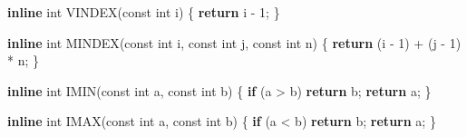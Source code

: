 \documentclass[
  12pt,
  letterpaper,
  DIV=11,
  numbers=noendperiod]{scrreprt}
\newenvironment{Shaded}{\begin{snugshade}}{\end{snugshade}}
\newcommand{\ControlFlowTok}[1]{\textcolor[rgb]{0.00,0.23,0.31}{\textbf{#1}}}
\newcommand{\DataTypeTok}[1]{\textcolor[rgb]{0.68,0.00,0.00}{#1}}
\newcommand{\DecValTok}[1]{\textcolor[rgb]{0.68,0.00,0.00}{#1}}
\newcommand{\KeywordTok}[1]{\textcolor[rgb]{0.00,0.23,0.31}{\textbf{#1}}}
\newcommand{\NormalTok}[1]{\textcolor[rgb]{0.00,0.23,0.31}{#1}}
\newcommand{\OperatorTok}[1]{\textcolor[rgb]{0.37,0.37,0.37}{#1}}
\theoremstyle{remark}
\begin{document}
\begin{Shaded}
\begin{Highlighting}[]
\KeywordTok{inline} \DataTypeTok{int}\NormalTok{ VINDEX}\OperatorTok{(}\DataTypeTok{const} \DataTypeTok{int}\NormalTok{ i}\OperatorTok{)} \OperatorTok{\{} \ControlFlowTok{return}\NormalTok{ i }\OperatorTok{{-}} \DecValTok{1}\OperatorTok{;} \OperatorTok{\}}

\KeywordTok{inline} \DataTypeTok{int}\NormalTok{ MINDEX}\OperatorTok{(}\DataTypeTok{const} \DataTypeTok{int}\NormalTok{ i}\OperatorTok{,} \DataTypeTok{const} \DataTypeTok{int}\NormalTok{ j}\OperatorTok{,} \DataTypeTok{const} \DataTypeTok{int}\NormalTok{ n}\OperatorTok{)} \OperatorTok{\{}
    \ControlFlowTok{return} \OperatorTok{(}\NormalTok{i }\OperatorTok{{-}} \DecValTok{1}\OperatorTok{)} \OperatorTok{+} \OperatorTok{(}\NormalTok{j }\OperatorTok{{-}} \DecValTok{1}\OperatorTok{)} \OperatorTok{*}\NormalTok{ n}\OperatorTok{;}
\OperatorTok{\}}

\KeywordTok{inline} \DataTypeTok{int}\NormalTok{ IMIN}\OperatorTok{(}\DataTypeTok{const} \DataTypeTok{int}\NormalTok{ a}\OperatorTok{,} \DataTypeTok{const} \DataTypeTok{int}\NormalTok{ b}\OperatorTok{)} \OperatorTok{\{}
    \ControlFlowTok{if} \OperatorTok{(}\NormalTok{a }\OperatorTok{\textgreater{}}\NormalTok{ b}\OperatorTok{)} \ControlFlowTok{return}\NormalTok{ b}\OperatorTok{;}
    \ControlFlowTok{return}\NormalTok{ a}\OperatorTok{;}
\OperatorTok{\}}

\KeywordTok{inline} \DataTypeTok{int}\NormalTok{ IMAX}\OperatorTok{(}\DataTypeTok{const} \DataTypeTok{int}\NormalTok{ a}\OperatorTok{,} \DataTypeTok{const} \DataTypeTok{int}\NormalTok{ b}\OperatorTok{)} \OperatorTok{\{}
    \ControlFlowTok{if} \OperatorTok{(}\NormalTok{a }\OperatorTok{\textless{}}\NormalTok{ b}\OperatorTok{)} \ControlFlowTok{return}\NormalTok{ b}\OperatorTok{;}
    \ControlFlowTok{return}\NormalTok{ a}\OperatorTok{;}
\OperatorTok{\}}


\end{Highlighting}
\end{Shaded}
\end{document}
